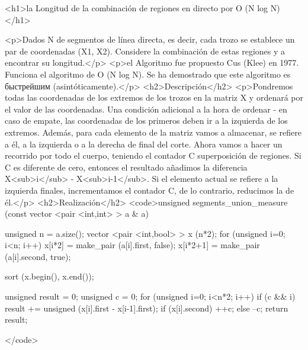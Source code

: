 <h1>la Longitud de la combinación de regiones en directo por O (N log N)</h1>

<p>Dados N de segmentos de línea directa, es decir, cada trozo se establece un par de coordenadas (X1, X2). Considere la combinación de estas regiones y a encontrar su longitud.</p>
<p>el Algoritmo fue propuesto Cus (Klee) en 1977. Funciona el algoritmo de O (N log N). Se ha demostrado que este algoritmo es быстрейшим (asintóticamente).</p>
<h2>Descripción</h2>
<p>Pondremos todas las coordenadas de los extremos de los trozos en la matriz X y ordenará por el valor de las coordenadas. Una condición adicional a la hora de ordenar - en caso de empate, las coordenadas de los primeros deben ir a la izquierda de los extremos. Además, para cada elemento de la matriz vamos a almacenar, se refiere a él, a la izquierda o a la derecha de final del corte. Ahora vamos a hacer un recorrido por todo el cuerpo, teniendo el contador C superposición de regiones. Si C es diferente de cero, entonces el resultado añadimos la diferencia X<sub>i</sub> - X<sub>i-1</sub>. Si el elemento actual se refiere a la izquierda finales, incrementamos el contador C, de lo contrario, reducimos la de él.</p>
<h2>Realización</h2>
<code>unsigned segments_union_measure (const vector <pair <int,int> > a & a)
{
unsigned n = a.size();
vector <pair <int,bool> > x (n*2);
for (unsigned i=0; i<n; i++)
{
x[i*2] = make_pair (a[i].first, false);
x[i*2+1] = make_pair (a[i].second, true);
}

sort (x.begin(), x.end());

unsigned result = 0;
unsigned c = 0;
for (unsigned i=0; i<n*2; i++)
{
if (c && i)
result += unsigned (x[i].first - x[i-1].first);
if (x[i].second)
++c;
else
--c;
}
return result;
}</code>